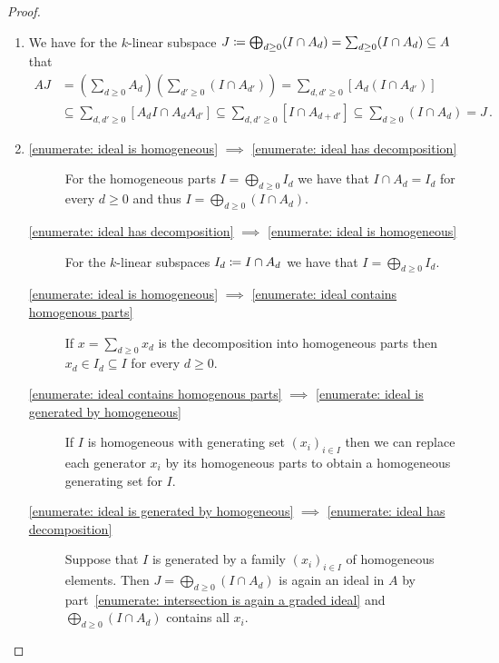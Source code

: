 \begin{proof}
  \leavevmode
  \begin{enumerate}
    \item
      We have for the $k$-linear subspace $J \coloneqq \bigoplus_{d \geq 0} (I \cap A_d) = \sum_{d \geq 0} (I \cap A_d) \subseteq A$ that
      \begin{align*}
                    A J
        &=          \left( \sum_{d \geq 0} A_d \right)\left( \sum_{d' \geq 0} (I \cap A_{d'}) \right)
         =          \sum_{d, d' \geq 0} [ A_d (I \cap A_{d'}) ] \\
        &\subseteq  \sum_{d, d' \geq 0} [ A_d I \cap A_d A_{d'} ]
         \subseteq  \sum_{d, d' \geq 0} [ I \cap A_{d+d'} ]
         \subseteq  \sum_{d \geq 0} (I \cap A_d)
         =          J \,.
      \end{align*}
    \item
      \begin{description}
        \item[\ref*{enumerate: ideal is homogeneous}
              $\implies$
              \ref*{enumerate: ideal has decomposition}]
          For the homogeneous parts $I = \bigoplus_{d \geq 0} I_d$ we have that $I \cap A_d = I_d$ for every $d \geq 0$ and thus $I = \bigoplus_{d \geq 0} (I \cap A_d)$.
        \item[\ref*{enumerate: ideal has decomposition}
              $\implies$
              \ref*{enumerate: ideal is homogeneous}]
          For the $k$-linear subspaces $I_d \coloneqq I \cap A_d$ we have that $I = \bigoplus_{d \geq 0} I_d$.
        \item[\ref*{enumerate: ideal is homogeneous}
              $\implies$
              \ref*{enumerate: ideal contains homogenous parts}]
          If $x = \sum_{d \geq 0} x_d$ is the decomposition into homogeneous parts then $x_d \in I_d \subseteq I$ for every $d \geq 0$.
        \item[\ref*{enumerate: ideal contains homogenous parts}
              $\implies$
              \ref*{enumerate: ideal is generated by homogeneous}]
          If $I$ is homogeneous with generating set $(x_i)_{i \in I}$ then we can replace each generator $x_i$ by its homogeneous parts to obtain a homogeneous generating set for $I$.
        \item[\ref*{enumerate: ideal is generated by homogeneous}
              $\implies$
              \ref*{enumerate: ideal has decomposition}]
          Suppose that $I$ is generated by a family $(x_i)_{i \in I}$ of homogeneous elements.
          Then $J = \bigoplus_{d \geq 0} (I \cap A_d)$ is again an ideal in $A$ by part~\ref*{enumerate: intersection is again a graded ideal} and $\bigoplus_{d \geq 0} (I \cap A_d)$ contains all $x_i$.

\end{description}
\end{enumerate}
\end{proof}
